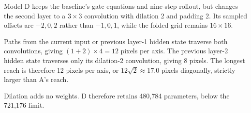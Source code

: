 Model D keeps the baseline's gate equations and nine-step rollout, but changes the second layer to a $3\times3$ convolution with dilation 2 and padding 2. Its sampled offsets are $-2,0,2$ rather than $-1,0,1$, while the folded grid remains $16\times16$.

Paths from the current input or previous layer-1 hidden state traverse both convolutions, giving $(1+2)\times4=12$ pixels per axis. The previous layer-2 hidden state traverses only its dilation-2 convolution, giving 8 pixels. The longest reach is therefore 12 pixels per axis, or $12\sqrt{2}\approx17.0$ pixels diagonally, strictly larger than A's reach.

Dilation adds no weights. D therefore retains 480,784 parameters, below the 721,176 limit.
